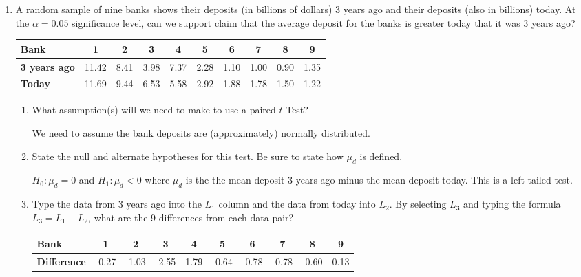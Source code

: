 \documentclass{article}
\newcommand{\answer}[1]{\color{white}#1}
\begin{document}
\begin{enumerate}
\item A random sample of nine banks shows their deposits (in billions of dollars) 3 years ago and their deposits (also in billions) today. At the $\alpha = 0.05$ significance level, can we support claim that the average deposit for the banks is greater today that it was 3 years ago?
    \begin{center}
    \begin{tabular}{|l|c|c|c|c|c|c|c|c|c|}
    \hline
    \textbf{Bank}   & 1 & 2 & 3 & 4 & 5 & 6 & 7 & 8 & 9  \\
    \hline
    \textbf{3 years ago} & 11.42 & 8.41 & 3.98 & 7.37 & 2.28 & 1.10 & 1.00 & 0.90 & 1.35 \\
    \hline
    \textbf{Today}       & 11.69 & 9.44 & 6.53 & 5.58 & 2.92 & 1.88 & 1.78 & 1.50 & 1.22 \\
    \hline
    \end{tabular}
    \end{center}
    
    \begin{enumerate}
        
        \item What assumption(s) will we need to make to use a paired $t$-Test?
        
        {\answer We need to assume the bank deposits are (approximately) normally distributed.}
        
        \vfill
        
        \item State the null and alternate hypotheses for this test. Be sure to state how $\mu_d$ is defined.
        
        {\answer $H_0 : \mu_d = 0$  and	$H_1: \mu_d < 0$ where $\mu_d$ is the the mean deposit 3 years ago minus the mean deposit today. This is a left-tailed test.}
        
        \vfill
        
        \item Type the data from 3 years ago into the $L_1$ column and the data from today into $L_2$. By selecting $L_3$ and typing the formula $L_3 = L_1 - L_2$, what are the 9 differences from each data pair?
        
        {\answer    \begin{tabular}{|l|c|c|c|c|c|c|c|c|c|}
                    \textbf{Bank}   & 1 & 2 & 3 & 4 & 5 & 6 & 7 & 8 & 9   \\
                    \hline
                    \textbf{Difference} & -0.27 & -1.03 & -2.55 & 1.79 & -0.64 & -0.78 & -0.78 & -0.60 & 0.13 \\
                    \end{tabular} }
        

\end{enumerate}
\end{enumerate}
\end{document}
